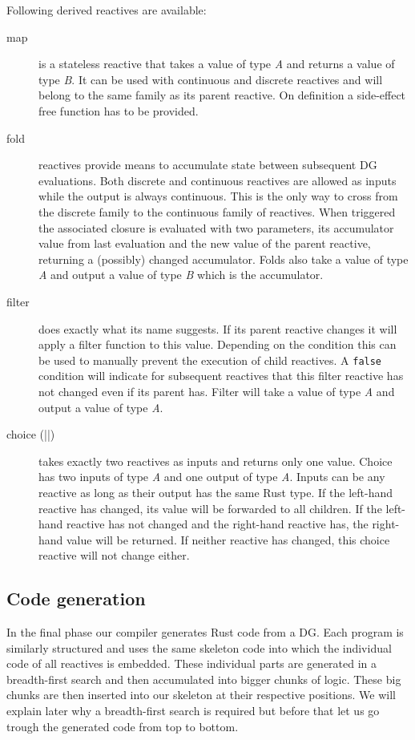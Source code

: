 Following derived reactives are available:

\begin{description}
\item[map] is a stateless reactive that takes a value of type \textit{A} and returns a value of type \textit{B}. It can be used with continuous and discrete reactives and will belong to the same family as its parent reactive. On definition a side-effect free function has to be provided.
\item[fold] reactives provide means to accumulate state between subsequent \ac{DG} evaluations. Both discrete and continuous reactives are allowed as inputs while the output is always continuous. This is the only way to cross from the discrete family to the continuous family of reactives. When triggered the associated closure is evaluated with two parameters, its accumulator value from last evaluation and the new value of the parent reactive, returning a (possibly) changed accumulator. Folds also take a value of type \textit{A} and output a value of type \textit{B} which is the accumulator.
\item[filter] does exactly what its name suggests. If its parent reactive changes it will apply a filter function to this value. Depending on the condition this can be used to manually prevent the execution of child reactives. A \lstinline{false} condition will indicate for subsequent reactives that this filter reactive has not changed even if its parent has. Filter will take a value of type \textit{A} and output a value of type \textit{A}.
\item[choice (||)] takes exactly two reactives as inputs and returns only one value. Choice has two inputs of type \textit{A} and one output of type \textit{A}. Inputs can be any reactive as long as their output has the same Rust type. If the left-hand reactive has changed, its value will be forwarded to all children. If the left-hand reactive has not changed and the right-hand reactive has, the right-hand value will be returned. If neither reactive has changed, this choice reactive will not change either.
\end{description}

\subsection{Code generation}
\label{rerust:codegen}
In the final phase our compiler generates Rust code from a \ac{DG}. Each \rerust program is similarly structured and uses the same skeleton code into which the individual code of all reactives is embedded. These individual parts are generated in a breadth-first search and then accumulated into bigger chunks of logic. These big chunks are then inserted into our skeleton at their respective positions. We will explain later why a breadth-first search is required but before that let us go trough the generated code from top to bottom.

